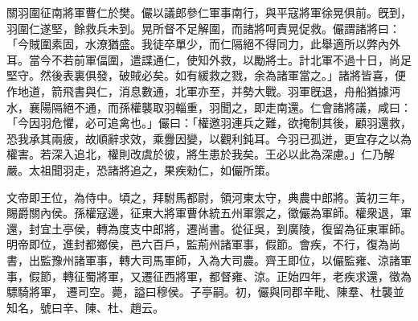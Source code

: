 \begin{pinyinscope}
 
 
 
 關羽圍征南將軍曹仁於樊。儼以議郎參仁軍事南行，與平寇將軍徐晃俱前。旣到，羽圍仁遂堅，餘救兵未到。晃所督不足解圍，而諸將呵責晃促救。儼謂諸將曰：「今賊圍素固，水潦猶盛。我徒卒單少，而仁隔絕不得同力，此舉適所以弊內外耳。當今不若前軍偪圍，遣諜通仁，使知外救，以勵將士。計北軍不過十日，尚足堅守。然後表裏俱發，破賊必矣。如有緩救之戮，余為諸軍當之。」諸將皆喜，便作地道，箭飛書與仁，消息數通，北軍亦至，并勢大戰。羽軍旣退，舟船猶據沔水，襄陽隔絕不通，而孫權襲取羽輜重，羽聞之，即走南還。仁會諸將議，咸曰：「今因羽危懼，必可追禽也。」儼曰：「權邀羽連兵之難，欲掩制其後，顧羽還救，恐我承其兩疲，故順辭求效，乘釁因變，以觀利鈍耳。今羽已孤迸，更宜存之以為權害。若深入追北，權則改虞於彼，將生患於我矣。王必以此為深慮。」仁乃解嚴。太祖聞羽走，恐諸將追之，果疾勑仁，如儼所策。
 
 
文帝即王位，為侍中。頃之，拜駙馬都尉，領河東太守，典農中郎將。黃初三年，賜爵關內侯。孫權寇邊，征東大將軍曹休統五州軍禦之，徵儼為軍師。權衆退，軍還，封宜土亭侯，轉為度支中郎將，遷尚書。從征吳，到廣陵，復留為征東軍師。明帝即位，進封都鄉侯，邑六百戶，監荊州諸軍事，假節。會疾，不行，復為尚書，出監豫州諸軍事，轉大司馬軍師，入為大司農。齊王即位，以儼監雍、涼諸軍事，假節，轉征蜀將軍，又遷征西將軍，都督雍、涼。正始四年，老疾求還，徵為驃騎將軍，
 遷司空。薨，謚曰穆侯。子亭嗣。初，儼與同郡辛毗、陳羣、杜襲並知名，號曰辛、陳、杜、趙云。
 
 
\end{pinyinscope}